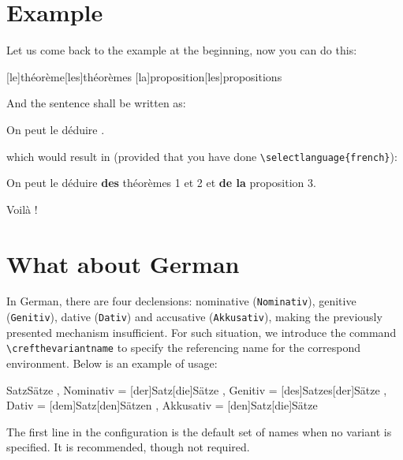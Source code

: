\documentclass[classical]{einfart}
\newenvironment{demo}
  {%
    \LocallyStopLineNumbers%
    \begin{tcolorbox}[enhanced jigsaw,pad at break*=1mm,breakable,
        left=2.5mm,right=3mm,top=0.5mm,bottom=0mm,
        colback=gray!5!paper,boxrule=0pt,frame hidden,
        borderline west={1.2mm}{0mm}{gray!55!paper},arc=.7mm]%
  }
  {%
    \end{tcolorbox}%
    \ResumeLineNumbers%
  }
\begin{document}


\section{Example}

Let us come back to the example at the beginning, now you can do this:

\begin{code}
[le]{théorème}[les]{théorèmes}
[la]{proposition}[les]{propositions}
\end{code}

And the sentence shall be written as:

\begin{code}
On peut le déduire .
\end{code}

which would result in (provided that you have done \lstinline|\selectlanguage{french}|):

\begin{demo}
    On peut le déduire \textbf{des} théorèmes 1 et 2 et \textbf{de la} proposition 3.
\end{demo}

Voilà !

\section{What about German}

In German, there are four declensions: nominative (\texttt{Nominativ}), genitive (\texttt{Genitiv}), dative (\texttt{Dativ}) and accusative (\texttt{Akkusativ}), making the previously presented mechanism insufficient. For such situation, we introduce the command \lstinline|\crefthevariantname| to specify the referencing name for the correspond environment. Below is an example of usage:

\begin{code}
  {
    {Satz}{Sätze}
    , Nominativ = [der]{Satz}[die]{Sätze}
    , Genitiv   = [des]{Satzes}[der]{Sätze}
    , Dativ     = [dem]{Satz}[den]{Sätzen}
    , Akkusativ = [den]{Satz}[die]{Sätze}
  }
\end{code}

The first line in the configuration is the default set of names when no variant is specified. It is recommended, though not required.
\end{document}
